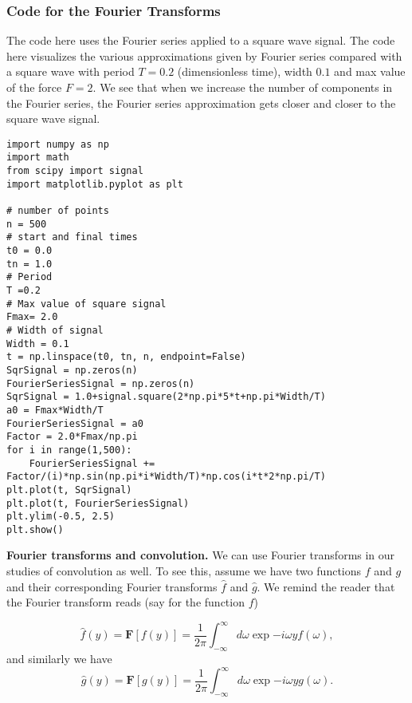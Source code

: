 \documentclass{beamer}
\begin{document}
\begin{frame}
\frametitle{Code for the  Fourier Transforms}

The code here uses the Fourier series applied to a 
square wave signal. The code here
visualizes the various approximations given by Fourier series compared
with a square wave with period $T=0.2$ (dimensionless time), width $0.1$ and max value of the force $F=2$. We
see that when we increase the number of components in the Fourier
series, the Fourier series approximation gets closer and closer to the
square wave signal.































\begin{verbatim}
import numpy as np
import math
from scipy import signal
import matplotlib.pyplot as plt

# number of points                                                                                       
n = 500
# start and final times                                                                                  
t0 = 0.0
tn = 1.0
# Period                                                                                                 
T =0.2
# Max value of square signal                                                                             
Fmax= 2.0
# Width of signal   
Width = 0.1
t = np.linspace(t0, tn, n, endpoint=False)
SqrSignal = np.zeros(n)
FourierSeriesSignal = np.zeros(n)
SqrSignal = 1.0+signal.square(2*np.pi*5*t+np.pi*Width/T)
a0 = Fmax*Width/T
FourierSeriesSignal = a0
Factor = 2.0*Fmax/np.pi
for i in range(1,500):
    FourierSeriesSignal += Factor/(i)*np.sin(np.pi*i*Width/T)*np.cos(i*t*2*np.pi/T)
plt.plot(t, SqrSignal)
plt.plot(t, FourierSeriesSignal)
plt.ylim(-0.5, 2.5)
plt.show()

\end{verbatim}


\noindent\textbf{Fourier transforms and convolution.}
We can use Fourier transforms in our studies of convolution as
well. To see this, assume we have two functions $f$ and $g$ and their
corresponding Fourier transforms $\hat{f}$ and $\hat{g}$. We remind
the reader that the Fourier transform reads (say for the function $f$)

\[
\hat{f}(y)=\bm{F}[f(y)]=\frac{1}{2\pi}\int_{-\infty}^{\infty} d\omega \exp{-i\omega y} f(\omega),
\]
and similarly we have
\[
\hat{g}(y)=\bm{F}[g(y)]=\frac{1}{2\pi}\int_{-\infty}^{\infty} d\omega \exp{-i\omega y} g(\omega).
\]
\end{frame}
\end{document}
